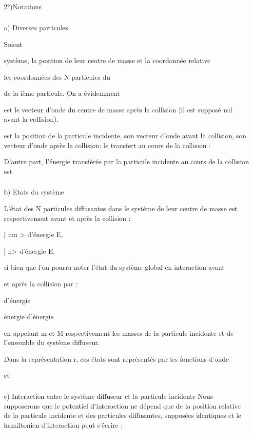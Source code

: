 
\subsection{}%
2°)Notations

\subsubsection{}%
a) Diverses particules

Soient

système,  la position de leur centre de masse et  la coordonnée relative

les coordonnées des N particules du

de la ième particule. On a évidemment

 est le vecteur d'onde du centre de masse après la collision (il est supposé
nul avant la collision).

 est la position de la particule incidente,  son vecteur d'onde avant la
collision,  son vecteur d'onde après la collision;  le transfert au cours de
la collision :

D'autre part, l'énergie transférée par la particule incidente au cours de la
collision est

\subsubsection{}%
b) Etats du système

L'état des N particules diffusantes dans le système de leur centre
de masse est respectivement avant et après la collision :

| nm > d'énergie E,

| n> d'énergie E,


si bien que l'on pourra noter l'état du système global en interaction avant

et après la collision par :

d'énergie

énergie
 d'énergie

en appelant m et M respectivement les masses de la particule incidente et de
l'ensemble du système diffuseur.

Dans la représentation r, ces états sont représentés par les
fonctions d'onde

et

\subsubsection{}%
c) Interaction entre le système diffuseur et la particule incidente
Nous supposerons que le potentiel d'interaction ne dépend que
de la position relative de la particule incidente et des particules diffusantes,
supposées identiques et le hamiltonien d'interaction peut s'écrire :

